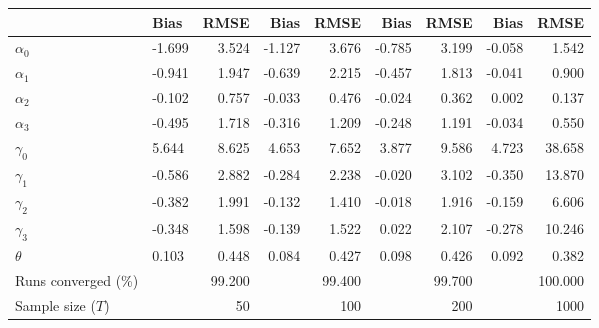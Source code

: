 
\begin{tabular}[t]{llrrrrrrr}
\toprule
  & Bias & RMSE & Bias & RMSE & Bias & RMSE & Bias & RMSE\\
\midrule
$\alpha_{0}$ & -1.699 & 3.524 & -1.127 & 3.676 & -0.785 & 3.199 & -0.058 & 1.542\\
$\alpha_{1}$ & -0.941 & 1.947 & -0.639 & 2.215 & -0.457 & 1.813 & -0.041 & 0.900\\
$\alpha_{2}$ & -0.102 & 0.757 & -0.033 & 0.476 & -0.024 & 0.362 & 0.002 & 0.137\\
$\alpha_{3}$ & -0.495 & 1.718 & -0.316 & 1.209 & -0.248 & 1.191 & -0.034 & 0.550\\
$\gamma_{0}$ & 5.644 & 8.625 & 4.653 & 7.652 & 3.877 & 9.586 & 4.723 & 38.658\\
$\gamma_{1}$ & -0.586 & 2.882 & -0.284 & 2.238 & -0.020 & 3.102 & -0.350 & 13.870\\
$\gamma_{2}$ & -0.382 & 1.991 & -0.132 & 1.410 & -0.018 & 1.916 & -0.159 & 6.606\\
$\gamma_{3}$ & -0.348 & 1.598 & -0.139 & 1.522 & 0.022 & 2.107 & -0.278 & 10.246\\
$\theta$ & 0.103 & 0.448 & 0.084 & 0.427 & 0.098 & 0.426 & 0.092 & 0.382\\
Runs converged (\%) &  & 99.200 &  & 99.400 &  & 99.700 &  & 100.000\\
Sample size ($T$) &  & 50 &  & 100 &  & 200 &  & 1000\\
\bottomrule
\end{tabular}

